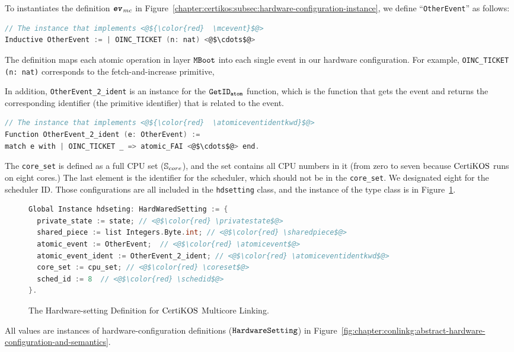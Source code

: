 To instantiates the definition ${{\mathrm{\texttt{\textbf{\textit{ev}}}}}_{mc}}$ in Figure~\ref{chapter:certikos:subsec:hardware-configuration-instance},
we define ``\lstinline$OtherEvent$'' as follows:
\begin{lstlisting}[language=C, deletekeywords={for}]
// The instance that implements <@${\color{red}  \mcevent}$@>
Inductive OtherEvent := | OINC_TICKET (n: nat) <@$\cdots$@> 
\end{lstlisting}
The definition maps each atomic operation in layer ${\mathrm{\texttt{MBoot}}}$ into each single event in our hardware configuration.
For example, \lstinline$OINC_TICKET (n: nat)$ corresponds to the fetch-and-increase primitive,

In addition, \lstinline$OtherEvent_2_ident$ is an instance for the ${{\mathrm{\texttt{GetID}}}_{{\mathrm{\texttt{atom}}}}}$ function, which is the function
that gets the event and returns the corresponding identifier (the primitive identifier) that is related to the event.
\begin{lstlisting}[language=C]
// The instance that implements <@${\color{red}  \atomiceventidentkwd}$@>
Function OtherEvent_2_ident (e: OtherEvent) := 
match e with | OINC_TICKET _ => atomic_FAI <@$\cdots$@> end.
\end{lstlisting}
The \lstinline$core_set$ is defined as a full CPU set (${\mathbb{S}_{core}}$), and 
the set contains all CPU numbers in it (from zero to seven because $\mathrm{CertiKOS}$ runs on eight cores.)
The last element is the identifier for 
the scheduler, which should not be in the \lstinline$core_set$. 
We designated eight for the scheduler ID.
Those configurations are all included in the 
\lstinline$hdsetting$ class, and the instance of the type class
is in Figure~\ref{fig:chapter:ceritkos:instances-of-abstract-hardware-setting}.
\begin{figure}
\begin{lstlisting}[language=C, deletekeywords={int}]
Global Instance hdseting: HardWaredSetting := {
  private_state := state; // <@$\color{red} \privatestate$@>
  shared_piece := list Integers.Byte.int; // <@$\color{red} \sharedpiece$@>
  atomic_event := OtherEvent;  // <@$\color{red} \atomicevent$@>
  atomic_event_ident := OtherEvent_2_ident; // <@$\color{red} \atomiceventidentkwd$@>
  core_set := cpu_set; // <@$\color{red} \coreset$@>
  sched_id := 8  // <@$\color{red} \schedid$@>
}.
\end{lstlisting}
\caption{The Hardware-setting Definition for $\mathrm{CertiKOS}$ Multicore Linking.}
\label{fig:chapter:ceritkos:instances-of-abstract-hardware-setting}
\end{figure}
All values are instances of 
hardware-configuration definitions (${\mathrm{\texttt{HardwareSetting}}}$) in Figure~\ref{fig:chapter:conlinkg:abstract-hardware-configuration-and-semantics}. 

